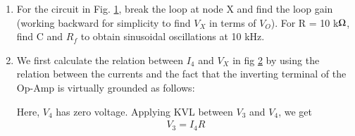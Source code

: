 \begin{enumerate}[label=\arabic*.,ref=\theenumi]

\item

For the circuit in Fig. \ref{fig:ee18btech11051_fig1}, break the loop at node X and find the loop gain (working backward for simplicity to find $V_{X}$ in terms of $V_{O}$). For R = 10 k$\ohm$, find C and $R_{f}$ to obtain sinusoidal oscillations at 10 kHz.

\begin{figure}[!ht]
	\begin{center}
		\resizebox{\columnwidth}{!}{}
	\end{center}
\caption{}
\label{fig:ee18btech11051_fig1}
\end{figure}

\item
\solution
We first calculate the relation between $I_{4}$ and $V_{X}$ in fig \ref{fig:ee18btech11051_fig2} by using the relation between the currents and the fact that the inverting terminal of the Op-Amp is virtually grounded as follows:
\begin{figure}[!ht]
	\begin{center}
		\resizebox{\columnwidth}{!}{}
	\end{center}
\caption{}
\label{fig:ee18btech11051_fig2}
\end{figure}

Here, $V_{4}$ has zero voltage. Applying KVL between $V_{3}$ and $V_{4}$, we get
\begin{align}
    V_{3} = I_{4}R \label{eq:ee18btech11051_0}
\end{align}


\end{enumerate}
